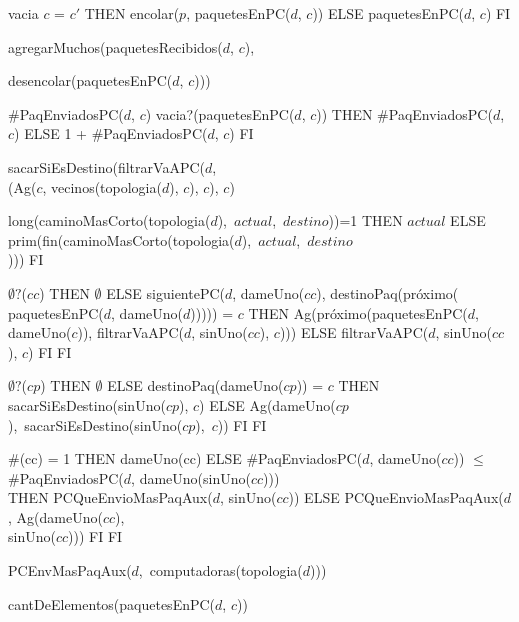 \begin{tad}{}
	 {vacia}
	 { \IF $c$ = $c'$
																	THEN encolar($p$, paquetesEnPC($d$, $c$))
																	ELSE paquetesEnPC($d$, $c$)
																	FI}	
			  {agregarMuchos(paquetesRecibidos($d$, $c$), 			  
			  
			  \hspace{6.5em}  desencolar(paquetesEnPC($d$, $c$)))}
	
	 {\#PaqEnviadosPC($d$, $c$)}
	 { \IF vacia?(paquetesEnPC($d$, $c$))
															 THEN \#PaqEnviadosPC($d$, $c$)
															 ELSE 1 + \#PaqEnviadosPC($d$, $c$)
															 FI}	
	
	 {sacarSiEsDestino(filtrarVaAPC($d$, \\
												(Ag($c$, vecinos(topologia($d$), $c$), $c$), $c$)}
	
	 {\IF \mbox{long(caminoMasCorto(topologia($d$), $actual$, $destino$))=1}
													   THEN $actual$
													   ELSE \mbox{prim(fin(caminoMasCorto(topologia($d$), $actual$, $destino$}
													   \\)))
													   FI}
	
	 {\IF $\emptyset?$($cc$)
										 	THEN $\emptyset$
										 	ELSE {\IF siguientePC($d$, dameUno($cc$), destinoPaq(próximo(
										 			   paquetesEnPC($d$, dameUno($d$))))) = $c$
										 			THEN Ag(próximo(paquetesEnPC($d$, dameUno($c$)), filtrarVaAPC($d$, sinUno($cc$), $c$)))
										 			ELSE filtrarVaAPC($d$, sinUno($cc$), $c$)
										 			FI}
											 FI}
	
	 {\IF $\emptyset?$($cp$)
											 THEN $\emptyset$
											 ELSE {\IF destinoPaq(dameUno($cp$)) = $c$
											 		THEN sacarSiEsDestino(sinUno($cp$), $c$)
											 		ELSE \mbox{Ag(dameUno($cp$), sacarSiEsDestino(sinUno($cp$), $c$))}
											 		FI}
											 FI} 	
	
	 { \IF \#(cc) = 1
												THEN dameUno(cc)
												ELSE {\IF \#PaqEnviadosPC($d$, dameUno($cc$)) $\leq$ \\
										        		 \hspace*{1.1em}\#PaqEnviadosPC($d$, dameUno(sinUno($cc$)))\\
											 		 THEN PCQueEnvioMasPaqAux($d$, sinUno($cc$))
											 		 ELSE PCQueEnvioMasPaqAux($d$, Ag(dameUno($cc$), \\
											 		 \hspace*{14em}				      sinUno($cc$)))
													 FI}
												FI}
	
	 {\mbox{PCEnvMasPaqAux($d$, computadoras(topologia($d$)))}}
	
	 {cantDeElementos(paquetesEnPC($d$, $c$))}
					
\end{tad}
